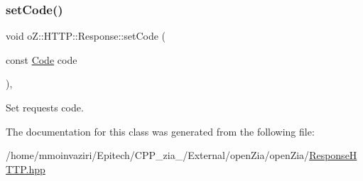 \subsubsection{\texorpdfstring{setCode()}{setCode()}}
{\footnotesize\ttfamily void o\+Z\+::\+H\+T\+T\+P\+::\+Response\+::set\+Code (\begin{DoxyParamCaption}\item[{const \mbox{\hyperlink{namespaceo_z_1_1_h_t_t_p_acd43703151305f79b1e2f42e98ee8199}{Code}}}]{code }\end{DoxyParamCaption})\hspace{0.3cm}{\ttfamily [inline]}, {\ttfamily [noexcept]}}



Set request\textquotesingle{}s code. 



The documentation for this class was generated from the following file\+:\begin{DoxyCompactItemize}
\item 
/home/mmoinvaziri/\+Epitech/\+C\+P\+P\+\_\+zia\+\_/\+External/open\+Zia/open\+Zia/\mbox{\hyperlink{_response_h_t_t_p_8hpp}{Response\+H\+T\+T\+P.\+hpp}}\end{DoxyCompactItemize}
